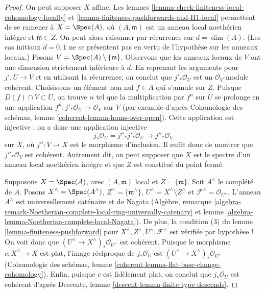 \begin{proof}
On peut supposer $X$ affine. Les lemmes \ref{lemma-check-finiteness-local-cohomology-locally} et \ref{lemma-finiteness-pushforwards-and-H1-local} permettent de se ramener à $X = \Spec(A)$, où $(A, \mathfrak m)$ est un anneau local noethérien intègre et $\mathfrak m \in Z$. On peut alors raisonner par récurrence sur $d = \dim(A)$. (Les cas initiaux $d = 0, 1$ ne se présentent pas en vertu de l'hypothèse sur les anneaux locaux.) Posons $V = \Spec(A) \setminus \{\mathfrak m\}$. Observons que les anneaux locaux de $V$ ont une dimension strictement inférieure à $d$. En reprenant les arguments pour $j' : U \to V$ et en utilisant la récurrence, on conclut que $j'_*\mathcal{O}_U$ est un $\mathcal{O}_V$-module cohérent. Choisissons un élément non nul $f \in A$ qui s'annule sur $Z$. Puisque $D(f) \cap V \subset U$, on trouve $n$ tel que la multiplication par $f^n$ sur $U$ se prolonge en une application $f^n : j'_*\mathcal{O}_U \to \mathcal{O}_V$ sur $V$ (par exemple d'après Cohomologie des schémas, lemme \ref{coherent-lemma-homs-over-open}). Cette application est injective ; on a donc une application injective
$$
j_*\mathcal{O}_U = j''_* j'_* \mathcal{O}_U \to j''_*\mathcal{O}_V
$$
sur $X$, où $j'' : V \to X$ est le morphisme d'inclusion. Il suffit donc de montrer que $j''_*\mathcal{O}_V$ est cohérent. Autrement dit, on peut supposer que $X$ est le spectre d'un anneau local noethérien intègre et que $Z$ est constitué du point fermé.

\medskip\noindent
Supposons $X = \Spec(A)$, avec $(A, \mathfrak m)$ local et $Z = \{\mathfrak m\}$. Soit $A^\wedge$ le complété de $A$. Posons $X^\wedge = \Spec(A^\wedge)$, $Z^\wedge = \{\mathfrak m^\wedge\}$, $U^\wedge = X^\wedge \setminus Z^\wedge$ et $\mathcal{F}^\wedge = \mathcal{O}_{U^\wedge}$. L'anneau $A^\wedge$ est universellement caténaire et de Nagata (Algèbre, remarque \ref{algebra-remark-Noetherian-complete-local-ring-universally-catenary} et lemme \ref{algebra-lemma-Noetherian-complete-local-Nagata}). De plus, la condition (3) du lemme \ref{lemma-finiteness-pushforward} pour $X^\wedge, Z^\wedge, U^\wedge, \mathcal{F}^\wedge$ est vérifiée par hypothèse ! On voit donc que $(U^\wedge \to X^\wedge)_*\mathcal{O}_{U^\wedge}$ est cohérent. Puisque le morphisme $c : X^\wedge \to X$ est plat, l'image réciproque de $j_*\mathcal{O}_U$ est $(U^\wedge \to X^\wedge)_*\mathcal{O}_{U^\wedge}$ (Cohomologie des schémas, lemme \ref{coherent-lemma-flat-base-change-cohomology}). Enfin, puisque $c$ est fidèlement plat, on conclut que $j_*\mathcal{O}_U$ est cohérent d'après Descente, lemme \ref{descent-lemma-finite-type-descends}.
\end{proof}

